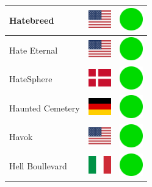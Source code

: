 \documentclass[12pt, a4paper, twoside]{report}
\begin{document}
\begin{center}
\begin{longtable}{|p{5cm}|p{2cm}|p{2cm}|}
Hatebreed & \includegraphics[width=1cm]{4x3/us} & \includegraphics[width=1cm]{likes/y} \\ \hline
Hate Eternal & \includegraphics[width=1cm]{4x3/us} & \includegraphics[width=1cm]{likes/y} \\ \hline
HateSphere & \includegraphics[width=1cm]{4x3/dk} & \includegraphics[width=1cm]{likes/y} \\ \hline
Haunted Cemetery & \includegraphics[width=1cm]{4x3/de} & \includegraphics[width=1cm]{likes/y} \\ \hline
Havok & \includegraphics[width=1cm]{4x3/us} & \includegraphics[width=1cm]{likes/y} \\ \hline
Hell Boullevard & \includegraphics[width=1cm]{4x3/it} & \includegraphics[width=1cm]{likes/y} \\ \hline

\end{longtable}
\end{center}
\end{document}
